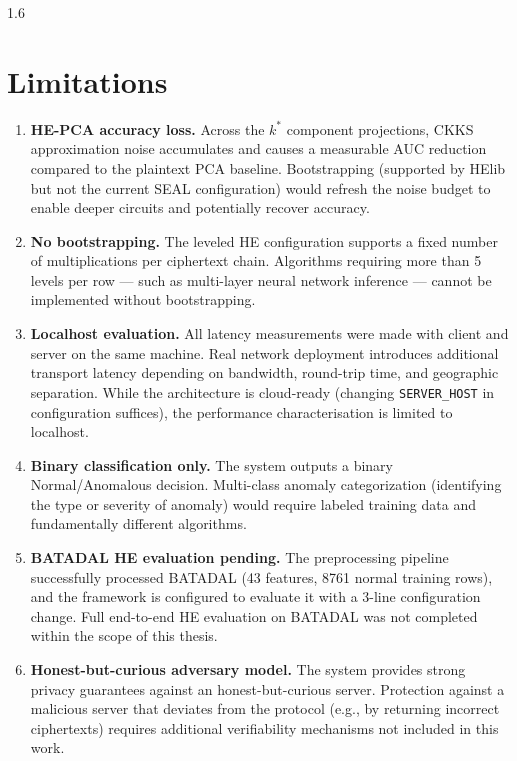 \begin{spacing}{1.6}
\section{Limitations}

\begin{enumerate}
  \item \textbf{HE-PCA accuracy loss.}
  Across the $k^*$ component projections, CKKS approximation noise accumulates
  and causes a measurable AUC reduction compared to the plaintext PCA baseline.
  Bootstrapping (supported by HElib but not the current SEAL configuration)
  would refresh the noise budget to enable deeper circuits and potentially
  recover accuracy.

  \item \textbf{No bootstrapping.}
  The leveled HE configuration supports a fixed number of multiplications per
  ciphertext chain. Algorithms requiring more than 5 levels per row --- such
  as multi-layer neural network inference --- cannot be implemented without
  bootstrapping.

  \item \textbf{Localhost evaluation.}
  All latency measurements were made with client and server on the same machine.
  Real network deployment introduces additional transport latency depending on
  bandwidth, round-trip time, and geographic separation. While the architecture
  is cloud-ready (changing \texttt{SERVER\_HOST} in configuration suffices),
  the performance characterisation is limited to localhost.

  \item \textbf{Binary classification only.}
  The system outputs a binary Normal/Anomalous decision. Multi-class anomaly
  categorization (identifying the type or severity of anomaly) would require
  labeled training data and fundamentally different algorithms.

  \item \textbf{BATADAL HE evaluation pending.}
  The preprocessing pipeline successfully processed BATADAL (43 features,
  8761 normal training rows), and the framework is configured to evaluate it
  with a 3-line configuration change. Full end-to-end HE evaluation on BATADAL
  was not completed within the scope of this thesis.

  \item \textbf{Honest-but-curious adversary model.}
  The system provides strong privacy guarantees against an honest-but-curious
  server. Protection against a malicious server that deviates from the protocol
  (e.g., by returning incorrect ciphertexts) requires additional verifiability
  mechanisms not included in this work.
\end{enumerate}


\end{spacing}
